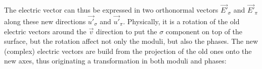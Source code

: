 \documentclass{iucr}
\begin{document}






The electric vector can thus be expressed in two orthonormal vectors $\vec{E'}_\sigma$ and $\vec{E'}_\pi$ along these 
new directions $\vec{u'}_\sigma$ and $\vec{u'}_\pi$. Physically, it is a rotation of the old electric vectors around
the $\vec{v}$ direction to put the $\sigma$ component on top of the surface, but the rotation affect not only the 
moduli, but also the phases. The new (complex) electric vectors are build from the projection of the old ones onto the
new axes, thus originating a transformation in both moduli and phases:
\end{document}

